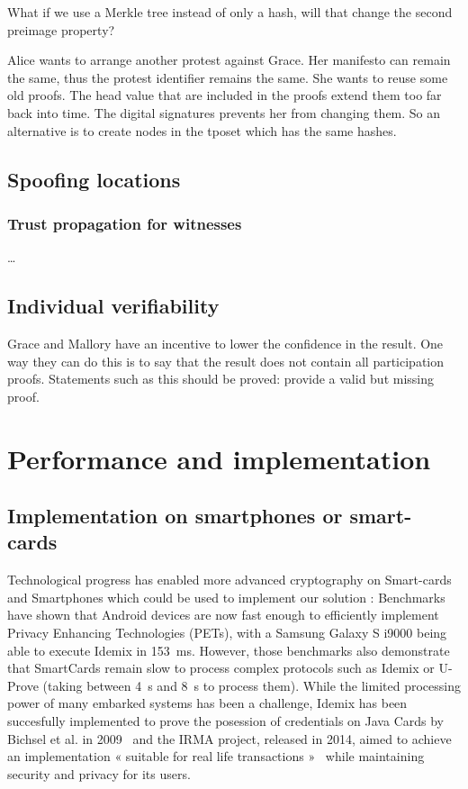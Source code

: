 \begin{question}
  What if we use a Merkle tree instead of only a hash, will that change the 
  second preimage property?
\end{question}

Alice wants to arrange another protest against Grace.
Her manifesto can remain the same, thus the protest identifier remains the 
same.
She wants to reuse some old proofs.
The head value that are included in the proofs extend them too far back into 
time.
The digital signatures prevents her from changing them.
So an alternative is to create nodes in the \ac{tposet} which has the same 
hashes.

\subsection{Spoofing locations}

\subsubsection{Trust propagation for witnesses}

\dots

\subsection{Individual verifiability}

Grace and Mallory have an incentive to lower the confidence in the result.
One way they can do this is to say that the result does not contain all 
participation proofs.
Statements such as this should be proved: provide a valid but missing proof.

\section{Performance and implementation}

\subsection{Implementation on smartphones or smart-cards}
Technological progress has enabled more advanced cryptography on Smart-cards and Smartphones which could be used to implement our solution : Benchmarks~\cite{Benchmarking} have shown that Android devices are now fast enough to efficiently implement Privacy Enhancing Technologies (PETs), with a Samsung Galaxy S i9000 being able to execute Idemix in  \SI{153}{\milli\second}. However, those benchmarks also demonstrate that SmartCards remain slow to process complex protocols such as Idemix or U-Prove (taking between \SI{4}{\second} and \SI{8}{\second} to process them). While the limited processing power of many embarked systems has been a challenge, Idemix has been succesfully implemented to prove the posession of credentials on Java Cards by Bichsel et al. in 2009~\cite{Bichsel} and the IRMA project, released in 2014, aimed to achieve an implementation « suitable for real life transactions »~\cite{IRMA} while maintaining security and privacy for its users. 

